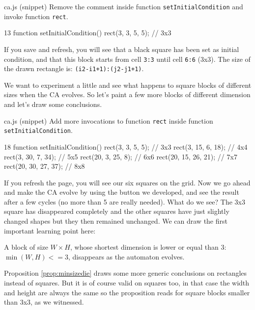 \begin{programcode}{ca.js (snippet)}
Remove the comment inside function \texttt{setInitialCondition} and
invoke function \texttt{rect}.
\begin{codeh1}{1}{3}
function setInitialCondition() {
  rect(3, 3, 5, 5); // 3x3
}
\end{codeh1}
\end{programcode}

If you save and refresh, you will see that a black square has been set as initial condition,
and that this block starts from cell \texttt{3:3} until cell \texttt{6:6} (3x3).
The size of the drawn rectangle is: \texttt{(i2-i1+1):(j2-j1+1)}.

We want to experiment a little and see what happens to square blocks of different sizes when
the CA evolves. So let's paint a few more blocks of different dimension and let's draw some
conclusions.

\begin{programcode}{ca.js (snippet)}
Add more invocations to function \texttt{rect} inside function \texttt{setInitialCondition}.
\begin{codeh1}{1}{8}
function setInitialCondition() {
  rect(3, 3, 5, 5); // 3x3
  rect(3, 15, 6, 18); // 4x4
  rect(3, 30, 7, 34); // 5x5
  rect(20, 3, 25, 8); // 6x6
  rect(20, 15, 26, 21); // 7x7
  rect(20, 30, 27, 37); // 8x8
}
\end{codeh1}
\end{programcode}

If you refresh the page, you will see our six squares on the grid. Now we go ahead and make the
CA evolve by using the button we developed, and see the result after a few cycles (no more than 5
are really needed). What do we see? The 3x3 square has disappeared completely and the other
squares have just slightly changed shapes but they then remained unchanged.
We can draw the first important learning point here:

\begin{proposition}
\label{prop:minsizedie}
A block of size $W \times H$, whose shortest dimension is lower or equal than 3: $\min(W,H) <= 3$,
disappears as the automaton evolves.
\end{proposition}

Proposition \ref{prop:minsizedie} draws some more generic conclusions on rectangles instead of squares.
But it is of course valid on squares too, in that case the width and height are always the same so
the proposition reads for square blocks smaller than 3x3, as we witnessed.


